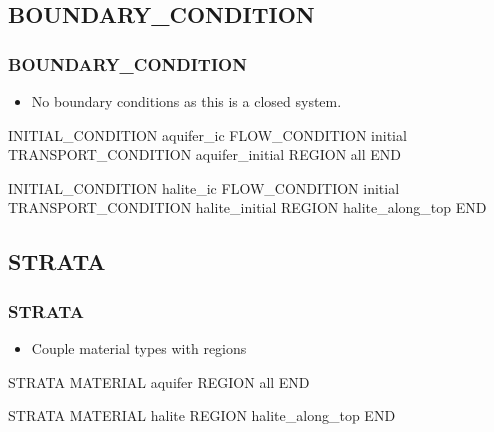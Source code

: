 \documentclass{beamer}
\begin{document}
\subsection{BOUNDARY\_CONDITION}

\begin{frame}[fragile]\frametitle{BOUNDARY\_CONDITION}

\begin{itemize}
  \item No boundary conditions as this is a closed system.
\end{itemize}

\begin{semiverbatim}
INITIAL_CONDITION aquifer_ic
  FLOW_CONDITION initial
  TRANSPORT_CONDITION aquifer_initial
  REGION all
END

INITIAL_CONDITION halite_ic
  FLOW_CONDITION initial
  TRANSPORT_CONDITION halite_initial
  REGION halite_along_top
END
\end{semiverbatim}

\end{frame}

\subsection{STRATA}

\begin{frame}[fragile]\frametitle{STRATA}

\begin{itemize}
\item Couple material types with regions
\end{itemize}

\begin{semiverbatim}
STRATA
  MATERIAL aquifer
  REGION all
END

STRATA
  MATERIAL halite
  REGION halite_along_top
END
\end{semiverbatim}

\end{frame}
\end{document}
